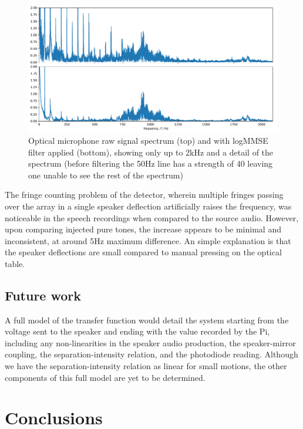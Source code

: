 \documentclass[prb,preprint]{revtex4-1}
\begin{document}
\begin{figure}%
	\includegraphics[width=\textwidth]{filter_spectrum_aa_melatos-cropped.pdf}
	\caption{Optical microphone raw signal spectrum (top) and with logMMSE filter applied (bottom), showing only up to 2kHz and a detail of the spectrum (before filtering the 50Hz line has a strength of 40 leaving one unable to see the rest of the spectrum)}
	\label{fig:logMMSE_spectrum}
\end{figure}

The fringe counting problem of the detector, wherein multiple fringes passing over the array in a single speaker deflection artificially raises the frequency, was noticeable in the speech recordings when compared to the source audio. However, upon comparing injected pure tones, the increase appears to be minimal and inconsistent, at around 5Hz maximum difference. An simple explanation is that the speaker deflections are small compared to manual pressing on the optical table.

\subsection{Future work}
A full model of the transfer function would detail the system starting from the voltage sent to the speaker and ending with the value recorded by the Pi, including any non-linearities in the speaker audio production, the speaker-mirror coupling, the separation-intensity relation, and the photodiode reading. Although we have the separation-intensity relation as linear for small motions, the other components of this full model are yet to be determined.



\section{Conclusions}
\end{document}
